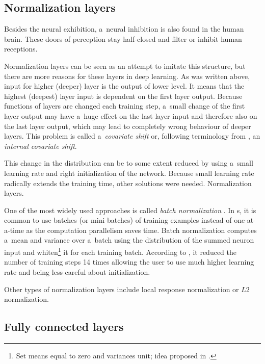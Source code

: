 \subsection{Normalization layers}
\label{norm-layers}

Besides the neural exhibition, a~neural inhibition is also found in the human
brain. These doors of perception stay half-closed and filter or inhibit human
receptions.

Normalization layers can be seen as an attempt to imitate this structure, but 
there are more reasons for these layers in deep learning. As was written above,
input for higher (deeper) layer is the output of lower level. It means that the
highest (deepest) layer input is dependent on the first layer output. Because 
functions of layers are changed each training step, a~small change of the first
layer output may have a~huge effect on the last layer input and therefore also
on the last layer output, which may lead to completely wrong behaviour of
deeper layers. This problem is called a~\textit{covariate shift} or, following
terminology from \cite{batch-norm}, an \textit{internal covariate shift}. 

This change in the distribution can be to some extent reduced by using a~small 
learning rate and right initialization of the network. Because small learning 
rate radically extends the training time, other solutions were needed. 
Normalization layers. 

One of the most widely used approaches is called \textit{batch normalization} 
\cite{batch-norm}. In s, it is common to use batches (or mini-batches) 
of training examples instead of one-at-a-time as the computation parallelism 
saves time. Batch normalization computes a~mean and variance over a~batch using
the distribution of the summed neuron input and whiten\footnote{Set means equal
to zero and variances unit; idea proposed in \cite{tricks}.} it for each 
training batch. According to \cite{batch-norm}, it reduced the number of 
training steps 14 times allowing the user to use much higher learning rate and 
being less careful about initialization.

Other types of normalization layers include local response normalization or 
$L2$ normalization.

\subsection{Fully connected layers}
\label{fc-layers}

